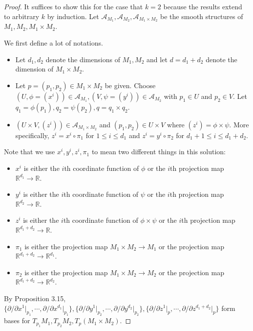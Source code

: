 \begin{proof}
  It suffices to show this for the case that $k = 2$ because the results extend to arbitrary $k$ by induction.
  Let $\mathcal{A}_{M_1}, \mathcal{A}_{M_2}, \mathcal{A}_{M_1 \times M_2}$ be the smooth structures of $M_1, M_2, M_1 \times M_2$.

  We first define a lot of notations.
  \begin{itemize}
    \item
      Let $d_1, d_2$ denote the dimensions of $M_1, M_2$ and let $d = d_1 + d_2$ denote the dimension of $M_1 \times M_2$.
    \item
      Let $p = (p_1, p_2) \in M_1 \times M_2$ be given.
      Choose $(U, \phi = (x^i)) \in \mathcal{A}_{M_1}, (V, \psi = (y^i)) \in \mathcal{A}_{M_2}$ with $p_1 \in U$ and $p_2 \in V$.
      Let $q_1 = \phi(p_1), q_2 = \psi(p_2), q = q_1 \times q_2$.
    \item
      $(U \times V, (z^i)) \in \mathcal{A}_{M_1 \times M_2}$ and $(p_1, p_2) \in U \times V$ where $(z^i) = \phi \times \psi$.
      More specifically, $z^i = x^i \circ \pi_1$ for $1 \leq i \leq d_1$ and $z^i = y^i \circ \pi_2$ for $d_1 + 1 \leq i \leq d_1 + d_2$.
  \end{itemize}
  Note that we use $x^i, y^i, z^i, \pi_1$ to mean two different things in this solution: 
  \begin{itemize}
    \item
      $x^i$ is either the $i$th coordinate function of $\phi$ or the $i$th projection map $\mathbb{R}^{d_1} \rightarrow \mathbb{R}$.
    \item
      $y^i$ is either the $i$th coordinate function of $\psi$ or the $i$th projection map $\mathbb{R}^{d_2} \rightarrow \mathbb{R}$.
    \item
      $z^i$ is either the $i$th coordinate function of $\phi \times \psi$ or the $i$th projection map $\mathbb{R}^{d_1 + d_2} \rightarrow \mathbb{R}$.
    \item
      $\pi_1$ is either the projection map $M_1 \times M_2 \rightarrow M_1$ or the projection map $\mathbb{R}^{d_1 + d_2} \rightarrow \mathbb{R}^{d_1}$.
    \item
      $\pi_2$ is either the projection map $M_1 \times M_2 \rightarrow M_2$ or the projection map $\mathbb{R}^{d_1 + d_2} \rightarrow \mathbb{R}^{d_2}$.
  \end{itemize}

  By Proposition 3.15, $\{ \partial / \partial x^1 \vert_{p_1}, \cdots, \partial / \partial x^{d_1} \vert_{p_1} \}, \{ \partial / \partial y^1 \vert_{p_2}, \cdots, \partial / \partial y^{d_2} \vert_{p_2} \}, \{ \partial / \partial z^1 \vert_{p}, \cdots, \partial / \partial z^{d_1 + d_2} \vert_{p} \}$ form bases for $T_{p_1}M_1, T_{p_2}M_2, T_p(M_1 \times M_2)$.


\end{proof}
